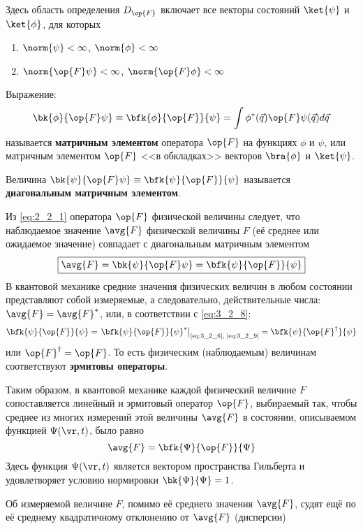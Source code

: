 Здесь область определения $D_{\op{F}}$ включает все векторы состояний $\ket{\psi}$ и $\ket{\phi}$, для которых
\begin{enumerate}
\item $\norm{\psi} < \infty$, $\norm{\phi} < \infty$
\item $\norm{\op{F} \psi} < \infty$, $\norm{\op{F} \phi} < \infty$
\end{enumerate}


\begin{defn}
Выражение:
$$
\bk{\phi}{\op{F}\psi} \equiv
  \bfk{\phi}{\op{F}}{\psi} =
  \int \phi^*(\vec{q})\op{F}\psi(\vec{q}) d\vec{q}
$$
называется \textbf{матричным элементом} оператора $\op{F}$ на функциях $\phi$ и $\psi$, или матричным элементом $\op{F}$ <<в обкладках>> векторов $\bra{\phi}$ и $\ket{\psi}$.

Величина $\bk{\psi}{\op{F}\psi} \equiv \bfk{\psi}{\op{F}}{\psi}$ называется \textbf{диагональным матричным элементом}.
\end{defn}

Из \eqref{eq:2_2_1} оператора $\op{F}$ физической величины следует, что наблюдаемое значение $\avg{F}$ физической величины $F$ (её среднее или ожидаемое значение) совпадает с диагональным матричным элементом
\begin{equation}
\label{eq:3_2_8}
\boxed {
	\avg{F} = \bk{\psi}{\op{F}\psi} = \bfk{\psi}{\op{F}}{\psi}
}
\end{equation}%
%
В квантовой механике средние значения физических величин в любом состоянии представляют собой измеряемые, а следовательно, действительные числа: $\avg{F} = \avg{F}^*$, или, в соответствии с \eqref{eq:3_2_8}:
\begin{equation}
\label{eq:3_2_9}
\bfk{\psi}{\op{F}}{\psi}
  = \left .\bfk{\psi}{\op{F}}{\psi}^* \right|_{\text{\eqref{eq:3_2_6}, \eqref{eq:3_2_9}}}
  = \bfk{\psi}{\op{F}^\dag}{\psi}
\end{equation}%
%
или $\op{F}^\dag = \op{F}$. То есть физическим (наблюдаемым) величинам соответствуют \textbf{эрмитовы операторы}.

Таким образом, в квантовой механике каждой физический величине $F$ сопоставляется линейный и эрмитовый оператор $\op{F}$, выбираемый так, чтобы среднее из многих измерений этой величины $\avg{F}$ в состоянии, описываемом функцией $\Psi(\vr, t)$, было равно
$$
\avg{F} = \bfk{\Psi}{\op{F}}{\Psi}
$$
Здесь функция $\Psi(\vr, t)$ является вектором пространства Гильберта и удовлетворяет условию нормировки $\bk{\Psi}{\Psi} = 1$.

Об измеряемой величине $F$, помимо её среднего значения $\avg{F}$, судят ещё по её среднему квадратичному отклонению от $\avg{F}$ (дисперсии)

